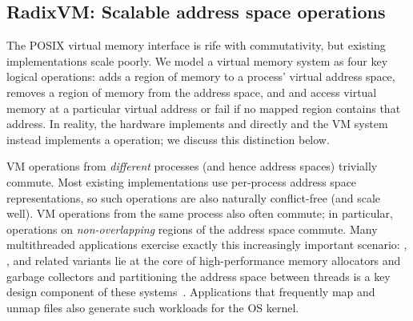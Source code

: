 \subsection{RadixVM: Scalable address space operations}

The POSIX virtual memory interface is rife with commutativity, but
existing implementations scale poorly.  We model a virtual memory
system as four key logical operations:  adds a region of
memory to a process' virtual address space,  removes a
region of memory from the address space, and  and
 access virtual memory at a particular virtual address
or fail if no mapped region contains that address.  In reality, the
hardware implements  and  directly and
the VM system instead implements a  operation; we
discuss this distinction below.



VM operations from \emph{different} processes (and hence address
spaces) trivially commute.  Most existing implementations use
per-process address space representations, so such operations are also
naturally conflict-free (and scale well).  VM operations from the same
process also often commute; in particular, operations on
\emph{non-overlapping} regions of the address space commute.
%
Many multithreaded applications exercise exactly this increasingly
important scenario: , , and related variants
lie at the core of high-performance memory allocators and garbage
collectors and partitioning the address space between threads is a key
design component of these
systems~\cite{ssmalloc:apsys,jemalloc,tcmalloc}.  Applications that
frequently map and unmap files also generate such workloads for the OS
kernel.

